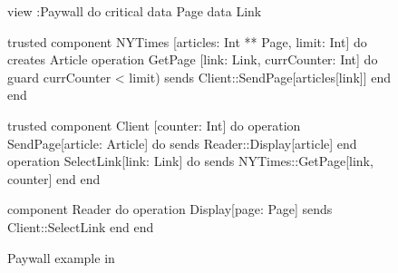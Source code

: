 \begin{figure}[ht]
\centering
  \begin{slang}
view :Paywall do
  critical data Page
  data Link
  
  trusted component NYTimes [articles: Int ** Page, limit: Int] do
    creates Article
    operation GetPage [link: Link, currCounter: Int] do
      guard { currCounter < limit) }
      sends { Client::SendPage[articles[link]] }
    end
  end

  trusted component Client [counter: Int] do
    operation SendPage[article: Article] do 
      sends { Reader::Display[article] }
    end
    operation SelectLink[link: Link] do
      sends { NYTimes::GetPage[link, counter] }
    end
  end

  component Reader do
    operation Display[page: Page]
    sends { Client::SelectLink }
  end
end
  \end{slang}

\caption{Paywall example in }
\label{fig-paywall-slang}
\end{figure}

